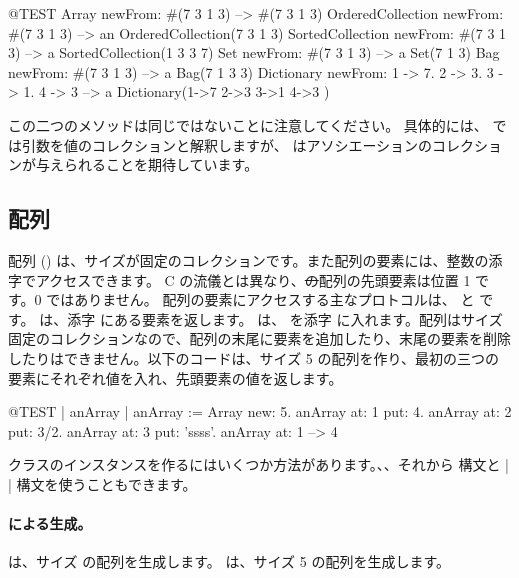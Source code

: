 \documentclass[a4paper,10pt,twoside]{book}
\begin{document}
\begin{code}{@TEST}
Array newFrom: #(7 3 1 3)                                          --> #(7 3 1 3)
OrderedCollection newFrom: #(7 3 1 3)                     --> an OrderedCollection(7 3 1 3)
SortedCollection newFrom: #(7 3 1 3)                       --> a SortedCollection(1 3 3 7)
Set newFrom: #(7 3 1 3)                                            --> a Set(7 1 3)
Bag newFrom: #(7 3 1 3)                                           --> a Bag(7 1 3 3)
Dictionary newFrom: {1 -> 7. 2 -> 3. 3 -> 1. 4 -> 3} --> a Dictionary(1->7 2->3 3->1 4->3 )
\end{code}
\noindent
この二つのメソッドは同じではないことに注意してください。
具体的には、 では引数を値のコレクションと解釈しますが、 はアソシエーションのコレクションが与えられることを期待しています。

\subsection{配列}
配列 () は、サイズが固定のコレクションです。また配列の要素には、整数の添字でアクセスできます。
C の流儀とは異なり、\st の配列の先頭要素は位置 1 です。0 ではありません。
配列の要素にアクセスする主なプロトコルは、 と  です。 は、添字  にある要素を返します。 は、 を添字  に入れます。配列はサイズ固定のコレクションなので、配列の末尾に要素を追加したり、末尾の要素を削除したりはできません。以下のコードは、サイズ 5 の配列を作り、最初の三つの要素にそれぞれ値を入れ、先頭要素の値を返します。

\begin{code}{@TEST | anArray | }
anArray := Array new: 5.
anArray at: 1 put: 4.
anArray at: 2 put: 3/2.
anArray at: 3 put: 'ssss'.
anArray at: 1 --> 4
\end{code}

 クラスのインスタンスを作るにはいくつか方法があります。、、それから \ct{#( )} 構文と \ct|{ }| 構文を使うこともできます。%

\paragraph{ による生成。}  は、サイズ  の配列を生成します。
 は、サイズ 5 の配列を生成します。
\end{document}
